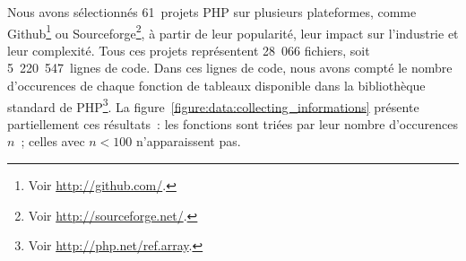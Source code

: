 Nous avons sélectionnés 61~projets PHP sur plusieurs plateformes, comme
Github\footnote{Voir \url{http://github.com/}.} ou Sourceforge\footnote{Voir
\url{http://sourceforge.net/}.}, à partir de leur popularité, leur impact sur
l'industrie et leur complexité. Tous ces projets représentent 28~066 fichiers,
soit 5~220~547~lignes de code. Dans ces lignes de code, nous avons compté le
nombre d'occurences de chaque fonction de tableaux disponible dans la
bibliothèque standard de PHP\footnote{Voir \url{http://php.net/ref.array}.}. La
figure~\ref{figure:data:collecting_informations} présente partiellement ces
résultats~: les fonctions sont triées par leur nombre d'occurences $n$~; celles
avec $n < 100$ n'apparaissent pas.
%
\begin{figure}

{
\Huge

}
\end{figure}
